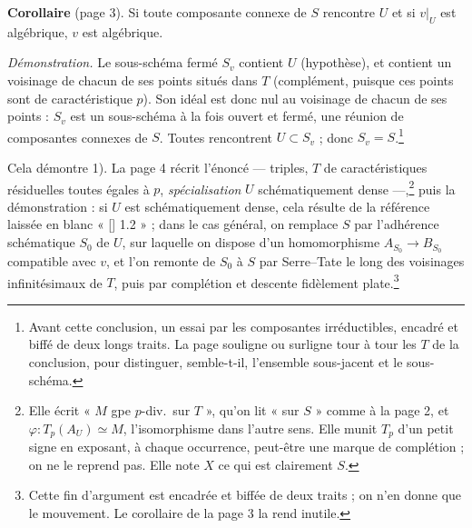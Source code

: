 \documentclass[11pt,a4paper]{article}
\begin{document}
\textbf{Corollaire} (page 3). Si toute composante connexe de $S$ rencontre $U$
et si $v|_U$ est algébrique, $v$ est algébrique.

\emph{Démonstration.} Le sous-schéma fermé $S_v$ contient $U$ (hypothèse), et
contient un voisinage de chacun de ses points situés dans $T$ (complément,
puisque ces points sont de caractéristique $p$). Son idéal est donc nul au
voisinage de chacun de ses points : $S_v$ est un sous-schéma à la fois ouvert
et fermé, une réunion de composantes connexes de $S$. Toutes rencontrent
$U \subset S_v$ ; donc $S_v = S$.\footnote{Avant cette conclusion, un essai
par les composantes irréductibles, encadré et biffé de deux longs traits. La
page souligne ou surligne tour à tour les $T$ de la conclusion, pour
distinguer, semble-t-il, l'ensemble sous-jacent et le sous-schéma.}

Cela démontre 1). La page 4 récrit l'énoncé --- triples, $T$ de
caractéristiques résiduelles toutes égales à $p$, \emph{spécialisation}
$U$ schématiquement dense ---,\footnote{Elle écrit « $M$ gpe $p$-div.\ sur
$T$ », qu'on lit « sur $S$ » comme à la page 2, et
$\varphi : T_p(A_U) \simeq M$, l'isomorphisme dans l'autre sens. Elle munit
$T_p$ d'un petit signe en exposant, à chaque occurrence, peut-être une
marque de complétion ; on ne le reprend pas. Elle note $X$ ce qui est
clairement $S$.} puis la démonstration : si $U$ est schématiquement dense,
cela résulte de la référence laissée en blanc « [\;] 1.2 » ; dans le cas
général, on remplace $S$ par l'adhérence schématique $S_0$ de $U$, sur
laquelle on dispose d'un homomorphisme $A_{S_0} \to B_{S_0}$ compatible avec
$v$, et l'on remonte de $S_0$ à $S$ par Serre--Tate le long des voisinages
infinitésimaux de $T$, puis par complétion et descente fidèlement
plate.\footnote{Cette fin d'argument est encadrée et biffée de deux traits ;
on n'en donne que le mouvement. Le corollaire de la page 3 la rend inutile.}
\end{document}
